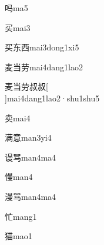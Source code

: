\begin{verbete}[6]{吗}{ma5}
\end{verbete}

\begin{verbete}[6]{买}{mai3}
\end{verbete}

\begin{verbete}[6;5;6]{买东西}{mai3dong1xi5}
\end{verbete}

\begin{verbete*}[7;6;7]{麦当劳}{mai4dang1lao2}
\end{verbete*}

\begin{verbete*}[7;6;7;8;8]{麦当劳叔叔}[\\]{mai4dang1lao2·shu1shu5}
\end{verbete*}

\begin{verbete}[8]{卖}{mai4}
\end{verbete}

\begin{verbete}[13;13]{满意}{man3yi4}
\end{verbete}

\begin{verbete}[13;9]{谩骂}{man4ma4}
\end{verbete}

\begin{verbete}[14]{慢}{man4}
\end{verbete}

\begin{verbete}[14;9]{漫骂}{man4ma4}
\end{verbete}

\begin{verbete}[6]{忙}{mang1}
\end{verbete}

\begin{verbete}[11]{猫}{mao1}
\end{verbete}

